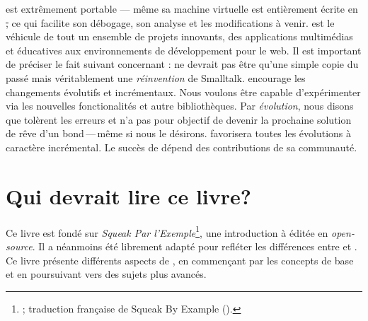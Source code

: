 \documentclass[a4paper,10pt,twoside]{book}
\begin{document}
\pharo est extrêmement portable --- même sa machine virtuelle est
entièrement écrite en \st, ce qui facilite son débogage, son
analyse et les modifications à venir. \pharo est le véhicule de tout
un ensemble de projets innovants, des applications multimédias et
éducatives aux environnements de développement pour le web.
Il est important de préciser le fait suivant concernant \pharo: 
\pharo ne devrait pas être qu'une simple copie du passé mais véritablement
une \emph{réinvention} de Smalltalk. 
\pharo encourage les changements évolutifs et
incrémentaux. Nous voulons être capable d'expérimenter via les
nouvelles fonctionalités et autre bibliothèques. Par \emph{évolution},
nous disons que \pharo tolèrent les erreurs et n'a pas pour objectif
de devenir la prochaine solution de rêve d'un bond\,---\,même si nous
le désirons.
\pharo favorisera toutes les évolutions à caractère incrémental. 
Le succès de \pharo dépend des contributions de sa communauté.

\section*{Qui devrait lire ce livre?}

Ce livre est fondé sur \emph{Squeak Par l'Exemple}\footnote{\spe;
  traduction française de Squeak By Example (\sbe).}, une introduction
à \squeak éditée en \emph{open-source}. Il a néanmoins été librement
adapté pour refléter les différences entre \pharo et \squeak. Ce livre 
présente différents aspects de \pharo, en commençant par les concepts 
de base et en poursuivant vers des sujets plus avancés.
\end{document}
